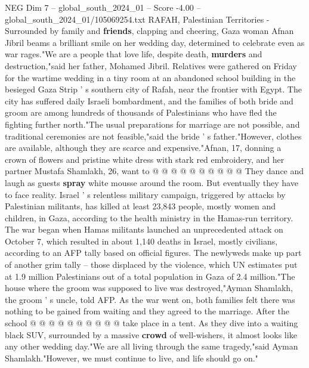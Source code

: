 \begin{textsample}{NEG Dim 7 – global\_south\_2024\_01 – Score -4.00 – global\_south\_2024\_01/105069254.txt}  \label{ex:f7_neg_407}
RAFAH, Palestinian Territories - Surrounded by family and \textbf{friends}, clapping and cheering, Gaza woman Afnan Jibril beams a brilliant smile on her wedding day, determined to celebrate even as war rages."We are a people that love life, despite death, \textbf{murders} and destruction,"said her father, Mohamed Jibril.
Relatives were gathered on Friday for the wartime wedding in a tiny room at an abandoned school building in the besieged Gaza Strip ' s southern city of Rafah, near the frontier with Egypt.
The city has suffered daily Israeli bombardment, and the families of both bride and groom are among hundreds of thousands of Palestinians who have fled the fighting further north."The usual preparations for marriage are not possible, and traditional ceremonies are not feasible,"said the bride ' s father."However, clothes are available, although they are scarce and expensive."Afnan, 17, donning a crown of flowers and pristine white dress with stark red embroidery, and her partner Mustafa Shamlakh, 26, want to @ @ @ @ @ @ @ @ @ @ They dance and laugh as guests \textbf{spray} white mousse around the room.
But eventually they have to face reality.
Israel ' s relentless military campaign, triggered by attacks by Palestinian militants, has killed at least 23,843 people, mostly women and children, in Gaza, according to the health ministry in the Hamas-run territory.
The war began when Hamas militants launched an unprecedented attack on October 7, which resulted in about 1,140 deaths in Israel, mostly civilians, according to an AFP tally based on official figures.
The newlyweds make up part of another grim tally -- those displaced by the violence, which UN estimates put at 1.9 million Palestinians out of a total population in Gaza of 2.4 million."The house where the groom was supposed to live was destroyed,"Ayman Shamlakh, the groom ' s uncle, told AFP.
As the war went on, both families felt there was nothing to be gained from waiting and they agreed to the marriage.
After the school @ @ @ @ @ @ @ @ @ @ take place in a tent.
As they dive into a waiting black SUV, surrounded by a massive \textbf{crowd} of well-wishers, it almost looks like any other wedding day."We are all living through the same tragedy,"said Ayman Shamlakh."However, we must continue to live, and life should go on."

\end{textsample}
